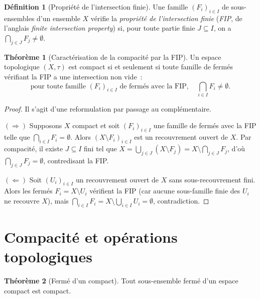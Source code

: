 \documentclass[12pt,a4paper,openany]{book}
\theoremstyle{definition}
\newtheorem{definition}{Définition}[chapter]
\theoremstyle{cours}
\newtheorem{theoreme}{Théorème}[chapter]
\theoremstyle{coursnormal}
\begin{document}
\begin{definition}[Propriété de l'intersection finie]\label{def:FIP}
  Une famille $(F_i)_{i\in I}$ de sous-ensembles d'un ensemble $X$ vérifie la
  \emph{propriété de l'intersection finie} (\emph{FIP}, de
  l'anglais \emph{finite intersection property}) si, pour toute partie finie
  $J\subseteq I$, on a $\bigcap_{j\in J}F_j\neq\emptyset$.
\end{definition}

\begin{theoreme}[Caractérisation de la compacité par la FIP]\label{thm:compact-FIP}
  Un espace topologique $(X,\tau)$ est compact si et seulement si toute famille
  de fermés vérifiant la FIP a une intersection non vide~:
  \[
    \text{pour toute famille } (F_i)_{i\in I} \text{ de fermés avec la FIP},
    \quad \bigcap_{i\in I}F_i\neq\emptyset.
  \]
\end{theoreme}

\begin{proof}
  Il s'agit d'une reformulation par passage au complémentaire.

  \medskip
  $(\Rightarrow)$ Supposons $X$ compact et soit $(F_i)_{i\in I}$ une famille
  de fermés avec la FIP telle que $\bigcap_{i\in I}F_i=\emptyset$. Alors
  $(X\setminus F_i)_{i\in I}$ est un recouvrement ouvert de $X$. Par
  compacité, il existe $J\subseteq I$ fini tel que
  $X=\bigcup_{j\in J}(X\setminus F_j)=X\setminus\bigcap_{j\in J}F_j$, d'où
  $\bigcap_{j\in J}F_j=\emptyset$, contredisant la FIP.

  \medskip
  $(\Leftarrow)$ Soit $(U_i)_{i\in I}$ un recouvrement ouvert de $X$ sans
  sous-recouvrement fini. Alors les fermés $F_i=X\setminus U_i$ vérifient la
  FIP (car aucune sous-famille finie des $U_i$ ne recouvre $X$), mais
  $\bigcap_{i\in I}F_i=X\setminus\bigcup_{i\in I}U_i=\emptyset$,
  contradiction.
\end{proof}

\section{Compacité et opérations topologiques}\label{sec:compact-operations}

\begin{theoreme}[Fermé d'un compact]\label{thm:ferme-compact}
  Tout sous-ensemble fermé d'un espace compact est compact.
\end{theoreme}
\end{document}
